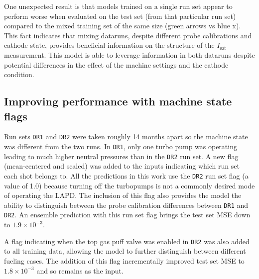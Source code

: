 One unexpected result is that models trained on a single run set appear to perform worse when evaluated on the test set (from that particular run set) compared to the mixed training set of the same size (green arrows vs blue x). This fact indicates that mixing dataruns, despite different probe calibrations and cathode state, provides beneficial information on the structure of the $I_\text{sat}$ measurement. This model is able to leverage information in both dataruns despite potential differences in the effect of the machine settings and the cathode condition.


\subsection{Improving performance with machine state flags}

Run sets \texttt{DR1} and \texttt{DR2} were taken roughly 14 months apart so the machine state was different from the two runs. In \texttt{DR1}, only one turbo pump was operating leading to much higher neutral pressures than in the \texttt{DR2} run set. A new flag (mean-centered and scaled) was added to the inputs indicating which run set each shot belongs to. All the predictions in this work use the \texttt{DR2} run set flag (a value of 1.0) because turning off the turbopumps is not a commonly desired mode of operating the LAPD. The inclusion of this flag also provides the model the ability to distinguish between the probe calibration differences between \texttt{DR1} and \texttt{DR2}. An ensemble prediction with this run set flag brings the test set MSE down to $1.9 \times 10^{-3}$.  

A flag indicating when the top gas puff valve was enabled in \texttt{DR2} was also added to all training data, allowing the model to further distinguish between different fueling cases. The addition of this flag incrementally improved test set MSE to $1.8 \times 10^{-3}$ and so remains as the input.


